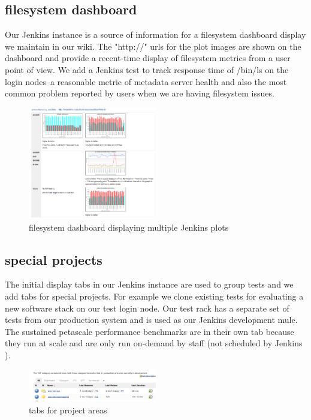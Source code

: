 \documentclass[10pt, conference, compsocconf]{IEEEtran}
\begin{document}
\subsection{filesystem dashboard}
Our Jenkins instance is a source of information for a filesystem dashboard display we maintain in our wiki.  The "http://" urls for the plot images are shown on the dashboard and provide a recent-time display of filesystem metrics from a user point of view.  We add a Jenkins test to track response time of /bin/ls on the login nodes--a reasonable metric of metadata server health and also the most common problem reported by users when we are having filesystem issues.
\begin{figure}[H]
\centering
\includegraphics[width=0.5\textwidth]{wiki-dashboard}
\caption{ filesystem dashboard displaying multiple Jenkins plots }
\label{fig:wiki-dashboard}
\end{figure}

\subsection{special projects}
The initial display tabs in our Jenkins instance are used to group tests and we add tabs for special projects.   For example we clone existing tests for evaluating a new software stack on our test login node.   Our test rack has a separate set of tests from our production system and is used as our Jenkins development mule.  The sustained petascale performance benchmarks are in their own tab because they run at scale and are only run on-demand by staff (not scheduled by Jenkins ).
\begin{figure}[H]
\centering
\includegraphics[width=0.5\textwidth]{tabs-display}
\caption{ tabs for project areas }
\label{fig:tabs-display}
\end{figure}
\end{document}
